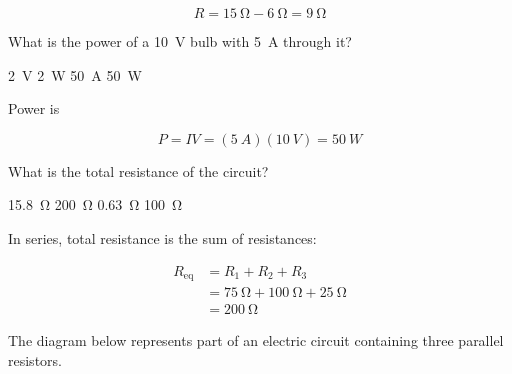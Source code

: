 \documentclass[]{exam}
\begin{document}
\begin{questions}
\begin{solution}
\begin{equation*}
    R = \SI{15}{\ohm} - \SI{6}{\ohm} = \boxed{\SI{9}{\ohm}}
\end{equation*}
\end{solution}

\question
What is the power of a \SI{10}{V} bulb with \SI{5}{A} through it?

\begin{randomizechoices}
    \choice \SI{2}{V}
    \choice \SI{2}{W}
    \choice \SI{50}{A}
    \correctchoice \SI{50}{W}
\end{randomizechoices}


\begin{solution}
Power is

\begin{equation*}
    P = IV = (\SI{5}{A})(\SI{10}{V}) = \boxed{\SI{50}{W}} 
\end{equation*}
\end{solution}

\question
What is the total resistance of the circuit?

\begin{center}
\end{center}

\begin{randomizechoices}
    \choice \SI{15.8}{\ohm}
    \correctchoice \SI{200}{\ohm}
    \choice \SI{0.63}{\ohm}
    \choice \SI{100}{\ohm}
\end{randomizechoices}

\begin{solution}
In series, total resistance is the sum of resistances:

\begin{align*}
    R_\mathrm{eq} &= R_1 + R_2 + R_3 \\[1ex]
    &= \SI{75}{\ohm} + \SI{100}{\ohm} + \SI{25}{\ohm} \\[1ex]
    &= \boxed{\SI{200}{\ohm}}
\end{align*}
\end{solution}

\question
The diagram below represents part of an electric circuit containing three parallel resistors.

\begin{center}
\end{center}



\end{questions}
\end{document}
